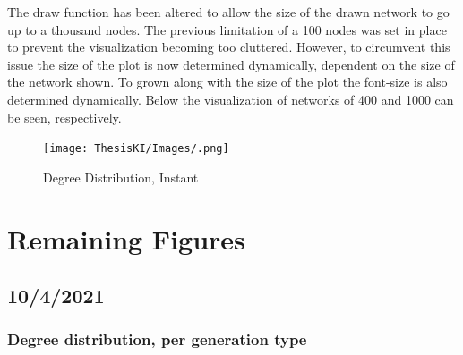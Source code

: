 \documentclass{article}
\begin{document}
The draw function has been altered to allow the size of the drawn network to go up to a thousand nodes. The previous limitation of a 100 nodes was set in place to prevent the visualization becoming too cluttered. However, to circumvent this issue the size of the plot is now determined dynamically, dependent on the size of the network shown. To grown along with the size of the plot the font-size is also determined dynamically. Below the visualization of networks of 400 and 1000 can be seen, respectively.
\begin{center}
    \begin{figure}[!htbp]
        \centering
        \texttt{[image: ThesisKI/Images/.png]}
        \caption{Degree Distribution, Instant}
        \label{degree:instant}
    \end{figure}
\end{center}
\newpage

\section{Remaining Figures}

\subsection{10/4/2021}

\subsubsection{Degree distribution, per generation type}
\end{document}
